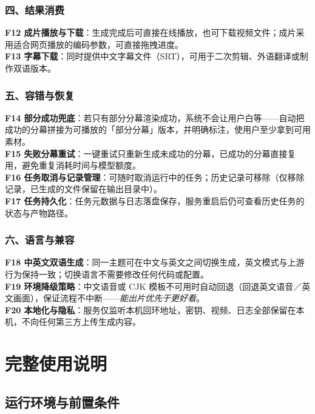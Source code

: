 \documentclass[11pt,a4paper]{ctexart}
\begin{document}
\subsubsection{四、结果消费}

\textbf{F12 成片播放与下载}：生成完成后可直接在线播放，也可下载视频文件；成片采用适合网页播放的编码参数，可直接拖拽进度。\\
\textbf{F13 字幕下载}：同时提供中文字幕文件（SRT），可用于二次剪辑、外语翻译或制作双语版本。

\subsubsection{五、容错与恢复}

\textbf{F14 部分成功兜底}：若只有部分分幕渲染成功，系统不会让用户白等——自动把成功的分幕拼接为可播放的「部分分幕」版本，并明确标注，使用户至少拿到可用素材。\\
\textbf{F15 失败分幕重试}：一键重试只重新生成未成功的分幕，已成功的分幕直接复用，避免重复消耗时间与模型额度。\\
\textbf{F16 任务取消与记录管理}：可随时取消运行中的任务；历史记录可移除（仅移除记录，已生成的文件保留在输出目录中）。\\
\textbf{F17 任务持久化}：任务元数据与日志落盘保存，服务重启后仍可查看历史任务的状态与产物路径。

\subsubsection{六、语言与兼容}

\textbf{F18 中英文双语生成}：同一主题可在中文与英文之间切换生成，英文模式与上游行为保持一致；切换语言不需要修改任何代码或配置。\\
\textbf{F19 环境降级策略}：中文语音或 CJK 模板不可用时自动回退（回退英文语音／英文画面），保证流程不中断——\emph{能出片优先于更好看}。\\
\textbf{F20 本地化与隐私}：服务仅监听本机回环地址，密钥、视频、日志全部保留在本机，不向任何第三方上传生成内容。

\section{完整使用说明}

\subsection{运行环境与前置条件}
\end{document}
